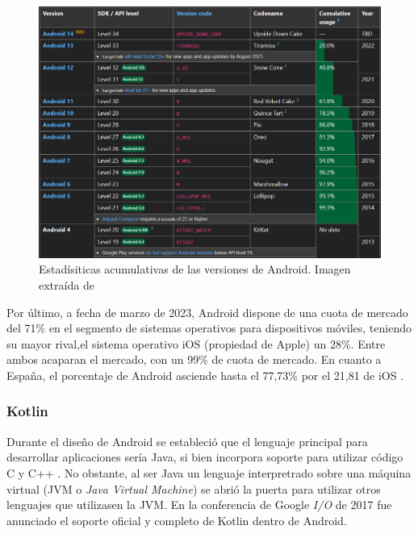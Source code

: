             \begin{figure}[H]
                \centering
                \includegraphics[width=1\textwidth]{figures/Android usage.PNG}
                \caption[Estadísiticas acumulativas de las versiones de Android]
                {Estadísiticas acumulativas de las versiones de Android. Imagen extraída de \cite{belinski_android_nodate}}
                \label{figure:android:usage}
            \end{figure}

            Por último, a fecha de marzo de 2023, Android dispone de una cuota de mercado del 71\% en el segmento de sistemas 
            operativos para dispositivos móviles, teniendo su mayor rival,el sistema operativo iOS (propiedad de Apple) 
            un 28\%. Entre ambos acaparan el mercado, con un 99\% de cuota de mercado. En cuanto a España, el 
            porcentaje de Android asciende hasta el 77,73\% por el 21,81 de iOS \cite{press_asi_2023}.

        \subsubsection{Kotlin}

            Durante el diseño de Android se estableció que el lenguaje principal para desarrollar aplicaciones sería 
            Java, si bien incorpora soporte para utilizar código C y C++ \cite{android_developers_como_nodate}. No
            obstante, al ser Java un lenguaje interpretrado sobre una máquina virtual (JVM o \textit{Java Virtual
            Machine}) se abrió la puerta para  utilizar otros lenguajes que utilizasen la JVM. En la conferencia de 
            Google \textit{I/O} de 2017 fue anunciado el soporte oficial y completo 
            de Kotlin dentro de Android. 
            
